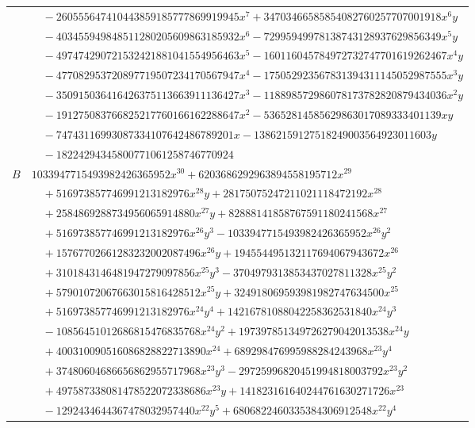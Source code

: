 \documentclass[11pt]{article}
\begin{document}
\begin{longtable}{@{}ll@{}}
 & $\quad -260555647410443859185777869919945x^{7}+34703466585854082760257707001918x^{6}y$\\
 & $\quad -403455949848511280205609863185932x^{6}-72995949978138743128937629856349x^{5}y$\\
 & $\quad -497474290721532421881041554956463x^{5}-160116045784972732747701619262467x^{4}y$\\
 & $\quad -477082953720897719507234170567947x^{4}-175052923567831394311145052987555x^{3}y$\\
 & $\quad -350915036416426375113663911136427x^{3}-118898572986078173782820879434036x^{2}y$\\
 & $\quad -191275083766825217760166162288647x^{2}-53652814585629863017089333401139xy$\\
 & $\quad -74743116993087334107642486789201x-13862159127518249003564923011603y$\\
 & $\quad -18224294345800771061258746770924$\\
$B$ & $1033947715493982426365952x^{30}+6203686292963894558195712x^{29}$\\
 & $\quad +516973857746991213182976x^{28}y+28175075247211021118472192x^{28}$\\
 & $\quad +2584869288734956065914880x^{27}y+82888141858767591180241568x^{27}$\\
 & $\quad +516973857746991213182976x^{26}y^{3}-1033947715493982426365952x^{26}y^{2}$\\
 & $\quad +15767702661283232002087496x^{26}y+194554495132117694067943672x^{26}$\\
 & $\quad +3101843146481947279097856x^{25}y^{3}-3704979313853437027811328x^{25}y^{2}$\\
 & $\quad +57901072067663015816428512x^{25}y+324918069593981982747634500x^{25}$\\
 & $\quad +516973857746991213182976x^{24}y^{4}+14216781088042258362531840x^{24}y^{3}$\\
 & $\quad -10856451012686815476835768x^{24}y^{2}+197397851349726279042013538x^{24}y$\\
 & $\quad +400310090516086828822713890x^{24}+689298476995988284243968x^{23}y^{4}$\\
 & $\quad +37480604686656862955717968x^{23}y^{3}-29725996820451994818003792x^{23}y^{2}$\\
 & $\quad +497587338081478522072338686x^{23}y+141823161640244761630271726x^{23}$\\
 & $\quad -1292434644367478032957440x^{22}y^{5}+6806822460335384306912548x^{22}y^{4}$\\

\end{longtable}
\end{document}
